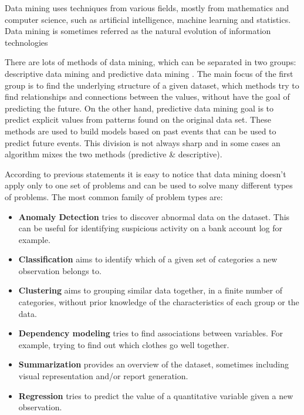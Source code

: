 Data mining uses techniques from various fields, mostly from mathematics and
computer science, such as artificial intelligence, machine learning and
statistics. Data mining is sometimes referred as the natural evolution of
information technologies \cite[p. 1]{HanKam06}

There are lots of methods of data mining, which can be separated in two groups:
descriptive data mining and predictive data mining
\cite{Fayyad96knowledgediscovery}. The main focus of the first group is to find
the underlying structure of a given dataset, which methods try to find
relationships and connections between the values, without have the goal of
predicting the future. On the other hand, predictive data mining goal is to
predict explicit values from patterns found on the original data set. These
methods are used to build models based on past events that can be used to
predict future events. This division is not always sharp and in some cases an
algorithm mixes the two methods (predictive \&
descriptive)\cite{Fayyad96knowledgediscovery}.

According to previous statements it is easy to notice that data mining doesn't
apply only to one set of problems and can be used to solve many different types
of problems. The most common family of problem types are: \begin{itemize} \item
      \textbf{Anomaly Detection} tries to discover abnormal data on the dataset.
      This can be useful for identifying suspicious activity on a bank account
    log for example. \item \textbf{Classification} aims to identify which of a
    given set of categories a new observation belongs to. \item
      \textbf{Clustering} aims to grouping similar data together, in a finite
      number of categories, without prior knowledge of the characteristics of
    each group or the data. \item \textbf{Dependency modeling} tries to find
      associations between variables. For example, trying to find out which
      clothes go well together. \item \textbf{Summarization} provides an
      overview of the dataset, sometimes including visual representation and/or
    report generation. \item \textbf{Regression} tries to predict the value of a
      quantitative variable given a new observation. \end{itemize}

